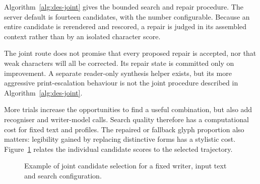 Algorithm~\ref{alg:des-joint} gives the bounded search and repair procedure. The server default is fourteen candidates, with the number configurable. Because an entire candidate is rerendered and rescored, a repair is judged in its assembled context rather than by an isolated character score.
\begin{designalgorithm}
\caption{Joint candidate search and bounded legibility repair}
\label{alg:des-joint}
\begin{designpseudo}
\end{designpseudo}
\end{designalgorithm}
The joint route does not promise that every proposed repair is accepted, nor that weak characters will all be corrected. Its repair state is committed only on improvement. A separate reader-only synthesis helper exists, but its more aggressive print-escalation behaviour is not the joint procedure described in Algorithm~\ref{alg:des-joint}.

More trials increase the opportunities to find a useful combination, but also add recogniser and writer-model calls. Search quality therefore has a computational cost for fixed text and profiles. The repaired or fallback glyph proportion also matters: legibility gained by replacing distinctive forms has a stylistic cost. Figure~\ref{fig:des-candidates} relates the individual candidate scores to the selected trajectory.
\begin{figure}[!htbp]\centering
{}
\caption{Example of joint candidate selection for a fixed writer, input text and search configuration.}
\label{fig:des-candidates}
\end{figure}

